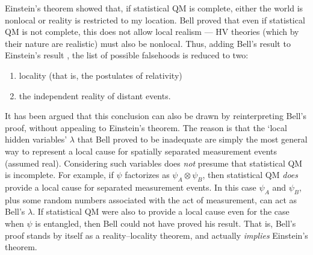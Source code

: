 \documentclass[12pt]{iopart}
\begin{document}
Einstein's theorem \cite{Ein46} showed that, if statistical QM is complete,
either the world is nonlocal or reality is restricted to my location. Bell proved that even if statistical QM is not complete, this does not allow local realism  --- HV theories (which by their nature are realistic) must also be nonlocal. Thus, adding Bell's result to Einstein's result \cite{Nor04}, the list of possible falsehoods is reduced to two:
\begin{enumerate}
\item locality (that is, the postulates of relativity)
\item the independent reality of distant events.
\end{enumerate}     

It has been argued \cite{Sta71,Ebe77} that this conclusion can also be drawn by 
reinterpreting Bell's proof, without appealing to Einstein's theorem. The reason is that the 
 `local hidden variables'  $\lambda$ that Bell proved to be inadequate  
 are simply the most general way to represent a local cause  for spatially separated measurement events (assumed real). Considering such variables does {\em not} presume that statistical QM is incomplete. For example, if $\psi$ factorizes as $\psi_A\otimes \psi_B$, then statistical QM {\em does} provide a local cause for separated measurement events. In this case $\psi_A$ and $\psi_B$, plus some random numbers associated with the act of measurement, can act as Bell's $\lambda$. If statistical QM were also to provide a local cause even for the case when $\psi$ is entangled, then Bell could not have proved his result. That is, Bell's proof stands by itself as a reality--locality theorem, and actually {\em implies} Einstein's theorem. 
 
\end{document}
